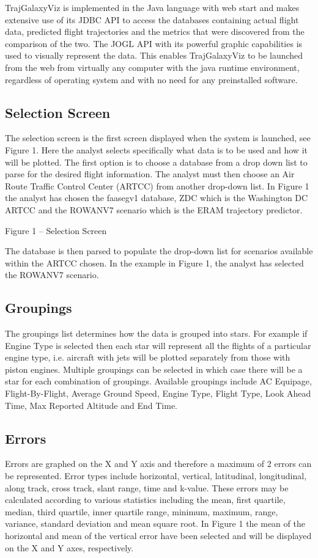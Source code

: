 \documentclass[]{article}
\begin{document}
TrajGalaxyViz is implemented in the Java language with web start and makes extensive use of its JDBC API to access the databases containing actual flight data, predicted flight trajectories and the metrics that were discovered from the comparison of the two.   The JOGL API with its powerful graphic capabilities is used to visually represent the data. This enables TrajGalaxyViz to be launched from the web from virtually any computer with the java runtime environment, regardless of operating system and with no need for any preinstalled software.
	
\subsection{Selection Screen}
\label{selectionScreen}
The selection screen is the first screen displayed when the system is launched, see Figure 1. Here the analyst selects specifically what data is to be used and how it will be plotted.  The first option is to choose a database from a drop down list to parse for the desired flight information. The analyst must then choose an Air Route Traffic Control Center (ARTCC) from another drop-down list. In Figure 1 the analyst has chosen the faasegv1 database, ZDC which is the Washington DC ARTCC and the ROWANV7 scenario which is the ERAM trajectory predictor.  


Figure 1 – Selection Screen

 The database is then parsed to populate the drop-down list for scenarios available within the ARTCC chosen. In the example in Figure 1, the analyst has selected the ROWANV7 scenario. 

\subsection{Groupings}
\label{groupings}
The groupings list determines how the data is grouped into stars. For example if Engine Type is selected then each star will represent all the flights of a particular engine type, i.e. aircraft with jets will be plotted separately from those with piston engines. Multiple groupings can be selected in which case there will be a star for each combination of groupings. Available groupings include AC Equipage, Flight-By-Flight, Average Ground Speed, Engine Type, Flight Type, Look Ahead Time, Max Reported Altitude and End Time.

\subsection{Errors}
\label{errors}
Errors are graphed on the X and Y axis and therefore a maximum of 2 errors can be represented. Error types include horizontal, vertical, latitudinal, longitudinal, along track, cross track, slant range, time and k-value. These errors may be calculated according to various statistics including the mean, first quartile, median, third quartile, inner quartile range, minimum, maximum, range, variance, standard deviation and mean square root. In Figure 1 the mean of the horizontal and mean of the vertical error have been selected and will be displayed on the X and Y axes, respectively. 
\end{document}
